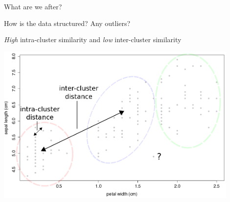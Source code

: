 \documentclass[pdf]{beamer}
\begin{document}
\begin{frame}{What are we after?}
\begin{description}[Motivation:]
	\item[Motivation:]  How is the data structured? Any outliers? 
	\item[Goals:]		\textit{High} intra-cluster similarity and \textit{low} inter-cluster similarity 
\end{description}
\begin{center}
	\includegraphics[width=0.9\textwidth]{samplePlot.png}
\end{center}
\end{frame}
\end{document}
